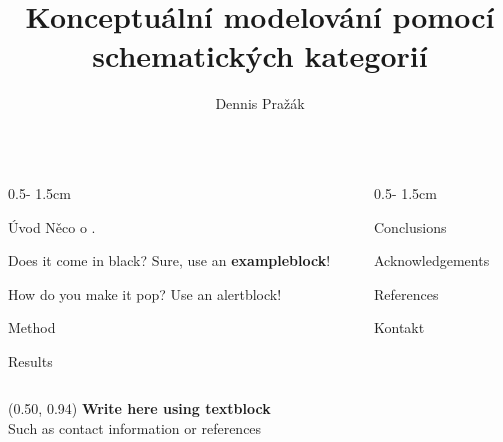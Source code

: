 \documentclass[a0paper]{uioposter}
\title{Konceptuální modelování pomocí schematických kategorií}
\author
{%
    Dennis Pražák 
}
\begin{document}
\begin{frame}
\begin{columns}[onlytextwidth]


\begin{column}{0.5\textwidth - 1.5cm}
    \begin{block}{Úvod}
        Něco o .
    \end{block}

    \begin{exampleblock}{Does it come in black?}
        Sure, use an \textbf{exampleblock}!
    \end{exampleblock}

    \begin{alertblock}{How do you make it pop?}
        Use an \alert{alertblock}!
    \end{alertblock}

    \begin{block}{Method}
        \lipsum[1]
    \end{block}

    \begin{block}{Results}
        \lipsum[2]
        \unskip
    \end{block}
\end{column}


\begin{column}{0.5\textwidth - 1.5cm}
    \begin{block}{Conclusions}
        \lipsum[4]
    \end{block}

    \begin{block}{Acknowledgements}
        \lipsum[5]
    \end{block}

    \begin{block}{References}
        \lipsum[6]
    \end{block}

    \begin{block}{Kontakt}
        \lipsum[75]
    \end{block}
\end{column}


\end{columns}


\begin{textblock}{0.5}(0.50, 0.94)
    \color{white}
    \sffamily
    \textbf{Write here using textblock}
    \\
    Such as contact information or references
\end{textblock}


\end{frame}
\end{document}
